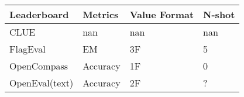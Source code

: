 \begin{tabular}{llll}
\toprule
Leaderboard & Metrics & Value Format & N-shot \\
\midrule
CLUE & nan & nan & nan \\
FlagEval & EM & 3F & 5 \\
OpenCompass & Accuracy & 1F & 0 \\
OpenEval(text) & Accuracy & 2F & ? \\
\bottomrule
\end{tabular}
